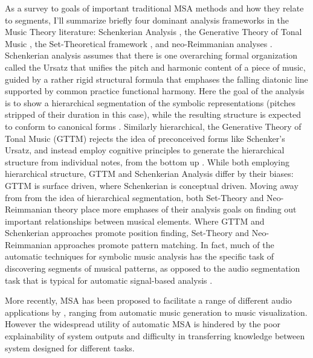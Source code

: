 As a survey to goals of important traditional MSA methods and how they relate to segments, I’ll summarize briefly four dominant analysis frameworks in the Music Theory literature: Schenkerian Analysis \citep{schenker2001free}, the Generative Theory of Tonal Music \citep{lerdahl1983generative}, the Set-Theoretical framework \citep{forte1973structure}, and neo-Reimmanian analyses \citep{cohn1998introduction}.
Schenkerian analysis assumes that there is one overarching formal organization called the Ursatz that unifies the pitch and harmonic content of a piece of music, guided by a rather rigid structural formula that emphases the falling diatonic line supported by common practice functional harmony. 
Here the goal of the analysis is to show a hierarchical segmentation of the symbolic representations (pitches stripped of their duration in this case), while the resulting structure is expected to conform to canonical forms \citep{schenker2001free}. 
Similarly hierarchical, the Generative Theory of Tonal Music (GTTM) rejects the idea of preconceived forms like Schenker’s Ursatz, and instead employ cognitive principles to generate the hierarchical structure from individual notes, from the bottom up \citep{lerdahl1983generative}.
While both employing hierarchical structure, GTTM and Schenkerian Analysis differ by their biases: GTTM is surface driven, where Schenkerian is conceptual driven.
Moving away from from the idea of hierarchical segmentation, both Set-Theory and Neo-Reimmanian theory place more emphases of their analysis goals on finding out important relationships between musical elements. 
Where GTTM and Schenkerian approaches promote position finding, Set-Theory and Neo-Reimmanian approaches promote pattern matching. 
In fact, much of the automatic techniques for symbolic music analysis has the specific task of discovering segments of musical patterns, as opposed to the audio segmentation task that is typical for automatic signal-based analysis \citep{janssen2013discovering}.

More recently, MSA has been proposed to facilitate a range of different audio applications by \cite{nieto2020structure}, ranging from automatic music generation to music visualization.
However the widespread utility of automatic MSA is hindered by the poor explainability of system outputs and difficulty in transferring knowledge between system designed for different tasks.

